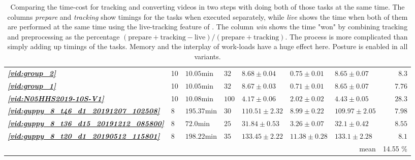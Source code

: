 \documentclass[9pt,lineno]{elife}
\newcommand{\vidref}[1]{\textit{\textbf{\ref{#1}}}}
\newcommand{\tableref}[1]{\textit{\textbf{\ref{tab:#1}}}\xspace}
\newcommand{\TGrabs}{\protect\path{TGrabs}}
\begin{document}
\begin{table}[h]
\begin{tabular}{l l l l | l l l | r}
\vidref{vid:group_2} & 10 & $ 10.05 \mathrm{min} $ & $ 32 $ & $ 8.68 \pm 0.04 $ & $ 0.75 \pm 0.01 $ & $ 8.65 \pm 0.07 $ &$ 8.3 $ \\
\vidref{vid:group_1} & 10 & $ 10.05 \mathrm{min} $ & $ 32 $ & $ 8.67 \pm 0.03 $ & $ 0.71 \pm 0.01 $ & $ 8.65 \pm 0.07 $ &$ 7.76 $ \\
\vidref{vid:N05HHS2019-10S-V1} & 10 & $ 10.08 \mathrm{min} $ & $ 100 $ & $ 4.17 \pm 0.06 $ & $ 2.02 \pm 0.02 $ & $ 4.43 \pm 0.05 $ &$ 28.3 $ \\
\vidref{vid:guppy_8_t46_d1_20191207_102508} & 8 & $ 195.37 \mathrm{min} $ & $ 30 $ & $ 110.51 \pm 2.32 $ & $ 8.99 \pm 0.22 $ & $ 109.97 \pm 2.05 $ &$ 7.98 $ \\
\vidref{vid:guppy_8_t36_d15_20191212_085800} & 8 & $ 72.0 \mathrm{min} $ & $ 25 $ & $ 31.84 \pm 0.53 $ & $ 3.26 \pm 0.07 $ & $ 32.1 \pm 0.42 $ &$ 8.55 $ \\
\vidref{vid:guppy_8_t20_d1_20190512_115801} & 8 & $ 198.22 \mathrm{min} $ & $ 35 $ & $ 133.45 \pm 2.22 $ & $ 11.38 \pm 0.28 $ & $ 133.1 \pm 2.28 $ &$ 8.1 $ \\
\hline
\multicolumn{7}{r}{mean} & 14.55 \%\\

\bottomrule
\end{tabular}

\medskip 
\caption{\label{tab:timings}Comparing the time-cost for tracking and converting videos in two steps with doing both of those tasks at the same time. The columns \textit{prepare} and \textit{tracking} show timings for the tasks when executed separately, while \textit{live} shows the time when both of them are performed at the same time using the live-tracking feature of \TGrabs{}. The column \textit{win} shows the time "won" by combining tracking and preprocessing as the percentage $(\mathrm{prepare}+\mathrm{tracking}-\mathrm{live})/(\mathrm{prepare}+\mathrm{tracking})$. The process is more complicated than simply adding up timings of the tasks. Memory and the interplay of work-loads have a huge effect here. Posture is enabled in all variants.}
\end{table}
\end{document}
